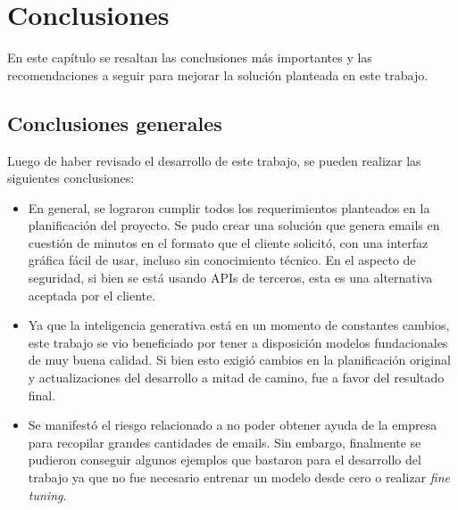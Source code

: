 
\chapter{Conclusiones} %

\label{Chapter5} %



En este capítulo se resaltan las conclusiones más importantes y las recomendaciones a seguir para mejorar la solución planteada en este trabajo.

\section{Conclusiones generales }

Luego de haber revisado el desarrollo de este trabajo, se pueden realizar las siguientes conclusiones:

\begin{itemize}
\item En general, se lograron cumplir todos los requerimientos planteados en la planificación del proyecto. Se pudo crear una solución que genera emails en cuestión de minutos en el formato que el cliente solicitó, con una interfaz gráfica fácil de usar, incluso sin conocimiento técnico. En el aspecto de seguridad, si bien se está usando APIs de terceros, esta es una alternativa aceptada por el cliente.
\item Ya que la inteligencia generativa está en un momento de constantes cambios, este trabajo se vio beneficiado por tener a disposición modelos fundacionales de muy buena calidad. Si bien esto exigió cambios en la planificación original y actualizaciones del desarrollo a mitad de camino, fue a favor del resultado final.
\item Se manifestó el riesgo relacionado a no poder obtener ayuda de la empresa para recopilar grandes cantidades de emails. Sin embargo, finalmente se pudieron conseguir algunos ejemplos que bastaron para el desarrollo del trabajo ya que no fue necesario entrenar un modelo desde cero o realizar \textit{fine tuning}.
\end{itemize}

